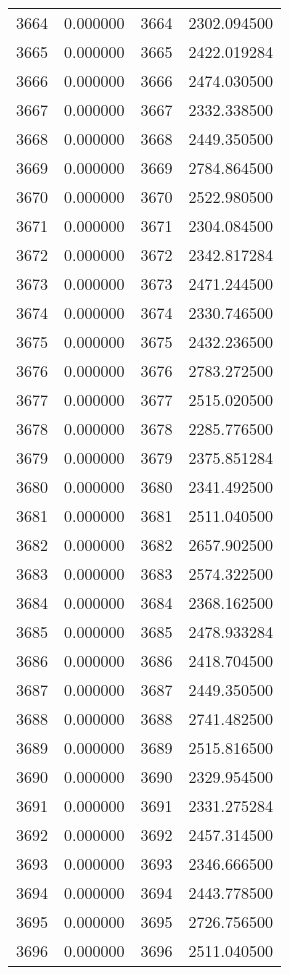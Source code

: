 \documentclass[12pt]{article}
\begin{document}
\begin{longtable}{@{}cccc@{}}
3664 & 0.000000 & 3664 & 2302.094500 \\
3665 & 0.000000 & 3665 & 2422.019284 \\
3666 & 0.000000 & 3666 & 2474.030500 \\
3667 & 0.000000 & 3667 & 2332.338500 \\
3668 & 0.000000 & 3668 & 2449.350500 \\
3669 & 0.000000 & 3669 & 2784.864500 \\
3670 & 0.000000 & 3670 & 2522.980500 \\
3671 & 0.000000 & 3671 & 2304.084500 \\
3672 & 0.000000 & 3672 & 2342.817284 \\
3673 & 0.000000 & 3673 & 2471.244500 \\
3674 & 0.000000 & 3674 & 2330.746500 \\
3675 & 0.000000 & 3675 & 2432.236500 \\
3676 & 0.000000 & 3676 & 2783.272500 \\
3677 & 0.000000 & 3677 & 2515.020500 \\
3678 & 0.000000 & 3678 & 2285.776500 \\
3679 & 0.000000 & 3679 & 2375.851284 \\
3680 & 0.000000 & 3680 & 2341.492500 \\
3681 & 0.000000 & 3681 & 2511.040500 \\
3682 & 0.000000 & 3682 & 2657.902500 \\
3683 & 0.000000 & 3683 & 2574.322500 \\
3684 & 0.000000 & 3684 & 2368.162500 \\
3685 & 0.000000 & 3685 & 2478.933284 \\
3686 & 0.000000 & 3686 & 2418.704500 \\
3687 & 0.000000 & 3687 & 2449.350500 \\
3688 & 0.000000 & 3688 & 2741.482500 \\
3689 & 0.000000 & 3689 & 2515.816500 \\
3690 & 0.000000 & 3690 & 2329.954500 \\
3691 & 0.000000 & 3691 & 2331.275284 \\
3692 & 0.000000 & 3692 & 2457.314500 \\
3693 & 0.000000 & 3693 & 2346.666500 \\
3694 & 0.000000 & 3694 & 2443.778500 \\
3695 & 0.000000 & 3695 & 2726.756500 \\
3696 & 0.000000 & 3696 & 2511.040500 \\

\end{longtable}
\end{document}
